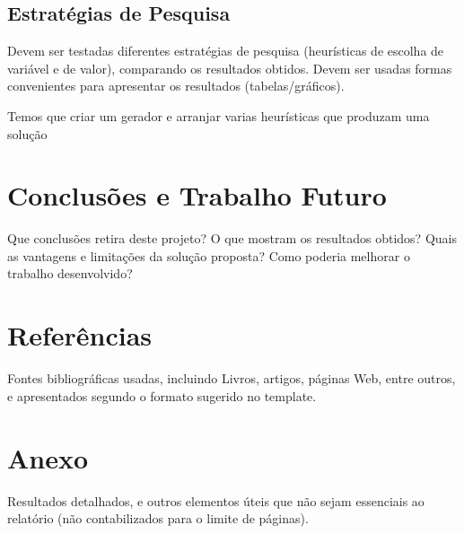 \documentclass[11pt]{article}
\begin{document}
\subsection{Estratégias de Pesquisa} Devem ser testadas diferentes estratégias de pesquisa
(heurísticas de escolha de variável e de valor), comparando os resultados obtidos.
Devem ser usadas formas convenientes para apresentar os resultados (tabelas/gráficos).

Temos que criar um gerador e arranjar varias heurísticas que produzam uma solução

\section{Conclusões e Trabalho Futuro} Que conclusões retira
deste projeto? O que mostram os resultados obtidos? Quais as vantagens e limitações da
solução proposta? Como poderia melhorar o trabalho desenvolvido?


\section{Referências} Fontes bibliográficas usadas, incluindo Livros, artigos, páginas
Web, entre outros, e apresentados segundo o formato sugerido no template.



\section{Anexo} Resultados detalhados, e outros elementos úteis que não sejam essenciais
ao relatório (não contabilizados para o limite de páginas).
\end{document}
